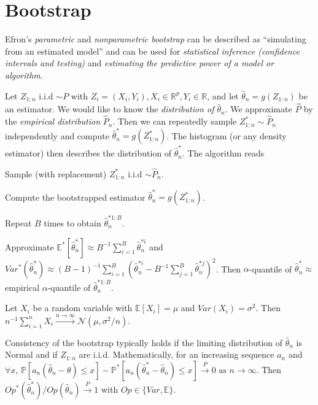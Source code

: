 \section{Bootstrap}\label{sec:bootstrap}
Efron's \emph{parametric} and \emph{nonparametric bootstrap} can be described as ``simulating from an estimated model'' and can be used for \emph{statistical inference (confidence intervals and testing)} and \emph{estimating the predictive power of a model or algorithm}.

\begin{sectionbox}\nospacing{}
  Let $Z_{1:n}$ i.i.d $\sim P$ with $Z_i=(X_i, Y_i), X_i \in \mathbb{R}^p, Y_i \in \mathbb{R}$, and let $\hat \theta_n = g(Z_{1:n})$ be an estimator.
  We would like to know the \emph{distribution of $\hat \theta_n$}.
  We approximate $\vec{P}$ by the \emph{empirical distribution} $\hat{P}_n$.
  Then we can repeatedly sample $Z_{1:n}^* \sim \hat P_n$ independently and compute $\hat\theta_n^* = g(Z_{1:n}^*)$.
  The histogram (or any density estimator) then describes the distribution of $\hat{\theta}_n^*$.
  The algorithm reads
  \begin{enumeratenosep}
    \item Sample (with replacement) $Z_{1:n}^\ast$ i.i.d $\sim \hat P_n$.
    \item Compute the bootstrapped estimator $\hat\theta_n^\ast=g(Z_{1:n}^\ast)$.
    \item Repeat $B$ times to obtain $\hat \theta_n^{\ast 1:B}$.
    \item Approximate $\mathbb{E}^\ast[\hat\theta_n^\ast] \approx B^{-1}\sum_{i=1}^B\hat\theta_n^{\ast i}$ and $Var^\ast(\hat\theta_n^\ast) \approx (B-1)^{-1}\sum_{i=1}^B\left(\hat\theta_n^{\ast i} - B^{-1}\sum_{j=1}^B \hat\theta_n^{\ast j}\right)^2$.
      Then $\alpha$-quantile of $\hat\theta_n^\ast \approx $ empirical $\alpha$-quantile of $\hat\theta_n^{\ast 1:B}$.
  \end{enumeratenosep}
\end{sectionbox}

\begin{notebox}\nospacing{}
  Let $X_i$ be a random variable with $\mathbb{E}[X_i] = \mu$ and $Var(X_i) = \sigma^2$. Then $n^{-1}\sum_{i=1}^nX_i \overset{n\to \infty}{\to} \mathcal{N}(\mu, \sigma^2/n)$.
\end{notebox}
\begin{notebox}\nospacing{}
  Consistency of the bootstrap typically holds if the limiting distribution of $\hat \theta_n$ is Normal and if $Z_{1:n}$ are i.i.d. 
  Mathematically, for an increasing sequence $a_n$ and $\forall x$, $\mathbb{P}[a_n(\hat\theta_n-\theta)\leq x] - \mathbb{P}^\ast[a_n(\hat\theta_n^\ast - \hat \theta_n) \leq x] \overset{P}\to 0 \text{ as } n \to \infty$.
  Then $Op^\ast(\hat\theta_n^\ast)/Op(\hat\theta_n) \overset{P}{\to} 1$ with $Op \in \{Var, \mathbb{E}\}$.
\end{notebox}

